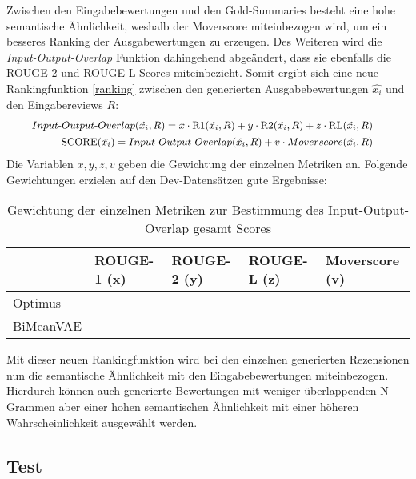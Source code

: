 Zwischen den Eingabebewertungen und den Gold-Summaries besteht eine hohe semantische Ähnlichkeit, weshalb der Moverscore miteinbezogen wird, um ein besseres Ranking der Ausgabewertungen zu erzeugen.
Des Weiteren wird die \textit{Input-Output-Overlap} Funktion dahingehend abgeändert, dass sie ebenfalls die ROUGE-2 und ROUGE-L Scores miteinbezieht.
Somit ergibt sich eine neue Rankingfunktion \ref{ranking} zwischen den generierten Ausgabebewertungen $\hat{x_i}$ und den Eingabereviews $R$:
\begin{align}
    \small
    \begin{split}
    Input\text{-}Output\text{-}Overlap(\hat{x_i}, R) &= x \cdot \text{R1}(\hat{x_i}, R)+y\cdot \text{R2}(\hat{x_i}, R)+z\cdot \text{RL}(\hat{x_i}, R) 
\end{split}\\
\small
\begin{split}
        \label{ranking}
    \text{SCORE}(\hat{x_i}) &= Input\text{-}Output\text{-}Overlap(\hat{x_i}, R) + v \cdot Moverscore(\hat{x_i}, R)
\end{split}
\end{align}
Die Variablen $x,y,z,v$ geben die Gewichtung der einzelnen Metriken an. Folgende Gewichtungen erzielen auf den Dev-Datensätzen gute Ergebnisse:

\begin{table}[h!]
    \centering
    \begin{tabular}{@{}lllll@{}}
    \toprule
              & ROUGE-1 (x)  & ROUGE-2 (y)  & ROUGE-L (z) & Moverscore (v) \\ \midrule
    Optimus   &   &   &   &   \\
    BiMeanVAE &   &   &   &   \\ \bottomrule
    \end{tabular}
    \caption{Gewichtung der einzelnen Metriken zur Bestimmung des Input-Output-Overlap gesamt Scores}
\end{table}

Mit dieser neuen Rankingfunktion wird bei den einzelnen generierten Rezensionen nun die semantische Ähnlichkeit mit den Eingabebewertungen miteinbezogen. 
Hierdurch können auch generierte Bewertungen mit weniger überlappenden N-Grammen aber einer hohen semantischen Ähnlichkeit mit einer höheren Wahrscheinlichkeit ausgewählt werden.


\subsection{Test}
\label{eval_pplm}



